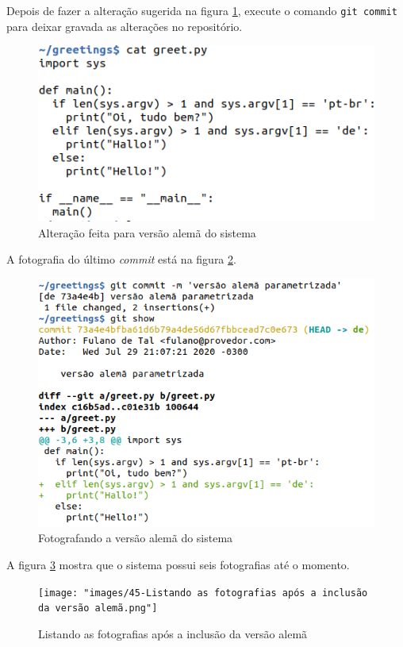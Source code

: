 \documentclass[a4paper]{book}
\begin{document}
Depois de fazer a alteração sugerida na figura \ref{fig:43},
execute o comando \texttt{git commit} para deixar 
gravada as alterações no repositório.

\begin{figure}[ht]
\caption{Alteração feita para versão alemã do sistema}
\label{fig:43}
\centering
\includegraphics[scale=0.6]{"images/43-Alteração feita para versão alemã do sistema.png"}
\end{figure}

A fotografia do último \textit{commit} está na figura
\ref{fig:44}.

\begin{figure}[ht]
\caption{Fotografando a versão alemã do sistema}
\label{fig:44}
\centering
\includegraphics[scale=0.6]{"images/44-Fotografando a versão alemã do sistema.png"}
\end{figure}

A figura \ref{fig:45} mostra que o sistema possui seis 
fotografias até o momento.

\begin{figure}[h!]
\caption{Listando as fotografias após a inclusão da versão alemã}
\label{fig:45}
\centering
\texttt{[image: "images/45-Listando as fotografias após a inclusão da versão alemã.png"]}
\end{figure}
\end{document}
